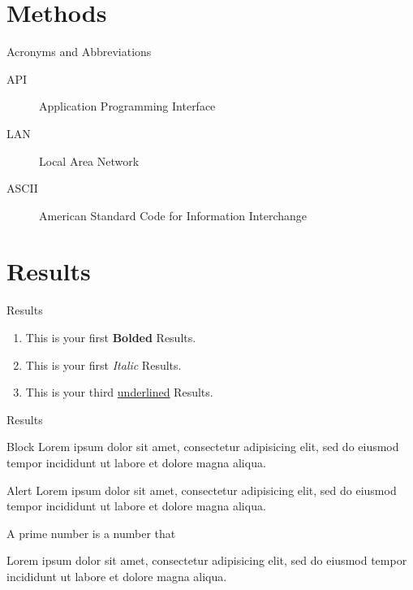 \documentclass[10pt]{beamer}
\begin{document}
	\section{Methods}
	\begin{frame}{Acronyms and Abbreviations}
		\begin{description}
			\item[API] Application Programming Interface
			\item[LAN] Local Area Network
			\item[ASCII] American Standard Code for Information Interchange
		\end{description}
	\end{frame}


	\section{Results}
	\begin{frame}{Results}
		\begin{enumerate}
			\item This is your first \textbf{Bolded} Results.
			\item This is your first \textit{Italic} Results.
			\item This is your third \underline{underlined} Results.

		\end{enumerate}
	\end{frame}
	\begin{frame}{Results}

		\begin{block}{Block }
			Lorem ipsum dolor sit amet, consectetur adipisicing elit,
			sed do eiusmod tempor incididunt ut labore et
			dolore magna aliqua.
		\end{block}

		\begin{alertblock}{Alert}
			Lorem ipsum dolor sit amet, consectetur adipisicing elit,
			sed do eiusmod tempor incididunt ut labore et
			dolore magna aliqua.
		\end{alertblock}

		\begin{definition}
			A prime number is a number that
		\end{definition}

		\begin{example}
			Lorem ipsum dolor sit amet, consectetur adipisicing elit,
			sed do eiusmod tempor incididunt ut labore et
			dolore magna aliqua.
		\end{example}

	\end{frame}
\end{document}
